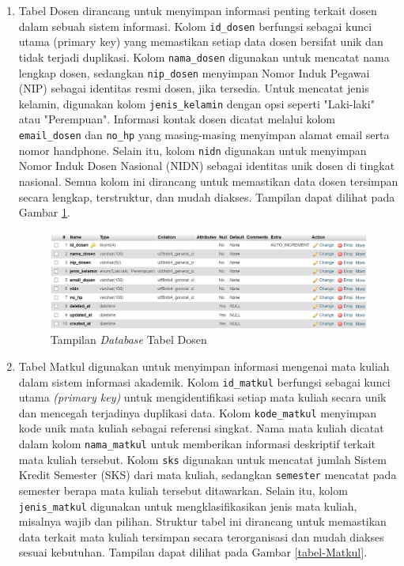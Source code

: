 \begin{enumerate}

	\item Tabel Dosen dirancang untuk menyimpan informasi penting terkait dosen dalam sebuah sistem informasi. Kolom \texttt{id\_dosen} berfungsi sebagai kunci utama (primary key) yang memastikan setiap data dosen bersifat unik dan tidak terjadi duplikasi. Kolom \texttt{nama\_dosen} digunakan untuk mencatat nama lengkap dosen, sedangkan \texttt{nip\_dosen} menyimpan Nomor Induk Pegawai (NIP) sebagai identitas resmi dosen, jika tersedia. Untuk mencatat jenis kelamin, digunakan kolom \texttt{jenis\_kelamin} dengan opsi seperti "Laki-laki" atau "Perempuan". Informasi kontak dosen dicatat melalui kolom \texttt{email\_dosen} dan \texttt{no\_hp} yang masing-masing menyimpan alamat email serta nomor handphone. Selain itu, kolom \texttt{nidn} digunakan untuk menyimpan Nomor Induk Dosen Nasional (NIDN) sebagai identitas unik dosen di tingkat nasional. Semua kolom ini dirancang untuk memastikan data dosen tersimpan secara lengkap, terstruktur, dan mudah diakses. Tampilan dapat dilihat pada Gambar \ref{tabel-Dosen}.

	      \begin{figure}
		      \centering
		      \includegraphics[width=1\textwidth]{konten/gambar/implementasi/tabel-dosen.png}
		      \caption{Tampilan \textit{Database} Tabel Dosen}
		      \label{tabel-Dosen}
	      \end{figure}


	\item Tabel Matkul digunakan untuk menyimpan informasi mengenai mata kuliah dalam sistem informasi akademik. Kolom \texttt{id\_matkul} berfungsi sebagai kunci utama \textit{(primary key)} untuk mengidentifikasi setiap mata kuliah secara unik dan mencegah terjadinya duplikasi data. Kolom \texttt{kode\_matkul} menyimpan kode unik mata kuliah sebagai referensi singkat. Nama mata kuliah dicatat dalam kolom \texttt{nama\_matkul} untuk memberikan informasi deskriptif terkait mata kuliah tersebut. Kolom \texttt{sks} digunakan untuk mencatat jumlah Sistem Kredit Semester (SKS) dari mata kuliah, sedangkan \texttt{semester} mencatat pada semester berapa mata kuliah tersebut ditawarkan. Selain itu, kolom \texttt{jenis\_matkul} digunakan untuk mengklasifikasikan jenis mata kuliah, misalnya wajib dan pilihan. Struktur tabel ini dirancang untuk memastikan data terkait mata kuliah tersimpan secara terorganisasi dan mudah diakses sesuai kebutuhan. Tampilan dapat dilihat pada Gambar \ref{tabel-Matkul}.


\end{enumerate}
